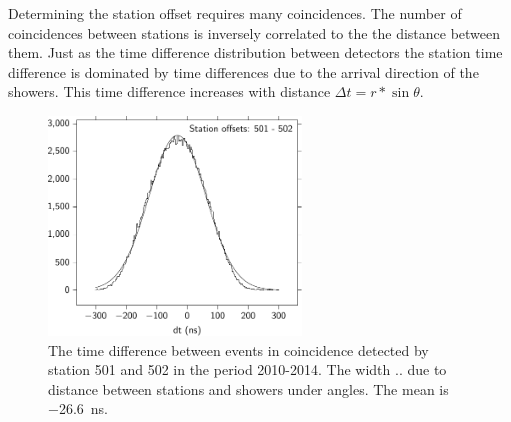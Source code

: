 Determining the station offset requires many coincidences. The number of
coincidences between stations is inversely correlated to the the
distance between them. Just as the time difference distribution between
detectors the station time difference is dominated by time differences
due to the arrival direction of the showers. This time difference
increases with distance $\Delta t = r * \sin{\theta}$.

\begin{figure}
    \centering
    \includegraphics[width=0.6\textwidth]{plots/response/station_offsets_501_502.pdf}
    \caption{ The
             time difference between events in coincidence detected by
             station 501 and 502 in the period 2010-2014. The width ..
             due to distance between stations and showers under angles.
             The mean is \SI{-26.6}{\nano\second}.}
    \label{fig:station_offsets_501_502}
\end{figure}

